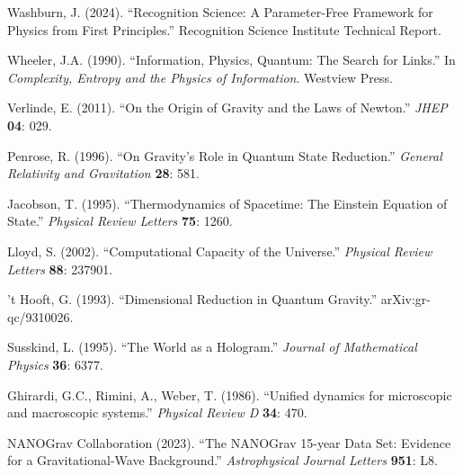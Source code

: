 \documentclass[twocolumn,prd,amsmath,amssymb,aps,superscriptaddress,nofootinbib]{revtex4-2}
\begin{document}
\begin{thebibliography}{99}

 Washburn, J. (2024). ``Recognition Science: A Parameter-Free Framework for Physics from First Principles.'' Recognition Science Institute Technical Report.

 Wheeler, J.A. (1990). ``Information, Physics, Quantum: The Search for Links.'' In \textit{Complexity, Entropy and the Physics of Information}. Westview Press.

 Verlinde, E. (2011). ``On the Origin of Gravity and the Laws of Newton.'' \textit{JHEP} \textbf{04}: 029.

 Penrose, R. (1996). ``On Gravity's Role in Quantum State Reduction.'' \textit{General Relativity and Gravitation} \textbf{28}: 581.

 Jacobson, T. (1995). ``Thermodynamics of Spacetime: The Einstein Equation of State.'' \textit{Physical Review Letters} \textbf{75}: 1260.

 Lloyd, S. (2002). ``Computational Capacity of the Universe.'' \textit{Physical Review Letters} \textbf{88}: 237901.

 't Hooft, G. (1993). ``Dimensional Reduction in Quantum Gravity.'' arXiv:gr-qc/9310026.

 Susskind, L. (1995). ``The World as a Hologram.'' \textit{Journal of Mathematical Physics} \textbf{36}: 6377.

 Ghirardi, G.C., Rimini, A., Weber, T. (1986). ``Unified dynamics for microscopic and macroscopic systems.'' \textit{Physical Review D} \textbf{34}: 470.

 NANOGrav Collaboration (2023). ``The NANOGrav 15-year Data Set: Evidence for a Gravitational-Wave Background.'' \textit{Astrophysical Journal Letters} \textbf{951}: L8.

\end{thebibliography}
\end{document}
